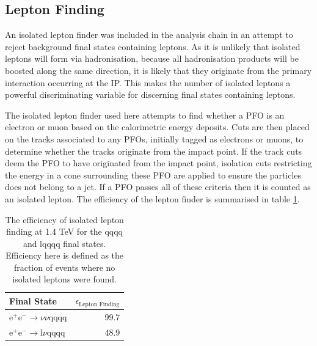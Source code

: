 
\subsection{Lepton Finding} 
\label{sec:isolatedleptonfinding}
An isolated lepton finder was included in the analysis chain in an attempt to reject background final states containing leptons.  As it is unlikely that isolated leptons will form via hadronisation, because all hadronisation products will be boosted along the same direction, it is likely that they originate from the primary interaction occurring at the IP.  This makes the number of isolated leptons a powerful discriminating variable for discerning final states containing leptons. 

The isolated lepton finder used here attempts to find whether a PFO is an electron or muon based on the calorimetric energy deposits.  Cuts are then placed on the tracks associated to any PFOs, initially tagged as electrons or muons, to determine whether the tracks originate from the impact point.  If the track cuts deem the PFO to have originated from the impact point, isolation cuts restricting the energy in a cone surrounding these PFO are applied to ensure the particles does not belong to a jet.  If a PFO passes all of these criteria then it is counted as an isolated lepton.  The efficiency of the lepton finder is summarised in table \ref{table:efficiencyleptonfinding}.   

\begin{table}[h!]
\centering
\begin{tabular}{ l r }
\hline
Final State & $\epsilon_{\text{Lepton Finding}}$ \\ 
\hline
$\text{e}^{+}\text{e}^{-} \rightarrow \nu{\nu}\text{qqqq}$ & 99.7 \\
$\text{e}^{+}\text{e}^{-} \rightarrow \text{l}\nu\text{qqqq}$ & 48.9 \\
\hline
\end{tabular}
\caption[The efficiency of isolated lepton finding at 1.4 TeV for the {\nu}{\nu}qqqq and l{\nu}qqqq final states.]{The efficiency of isolated lepton finding at 1.4 TeV for the {\nu}{\nu}qqqq and l{\nu}qqqq final states.  Efficiency here is defined as the fraction of events where no isolated leptons were found.}
\label{table:efficiencyleptonfinding}
\end{table}


